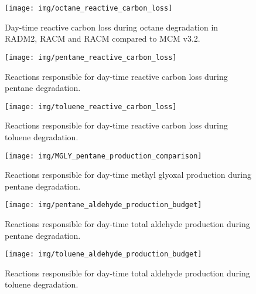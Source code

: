 
\begin{figure}[!htbp]
    \begin{center}
        \texttt{[image: img/octane\_reactive\_carbon\_loss]}
        \caption{Day-time reactive carbon loss during octane degradation in RADM2, RACM and RACM compared to MCM v3.2.}
        \label{f:octane_carbons}
    \end{center}
\end{figure} 

\begin{figure}[!htbp]
    \begin{center}
        \texttt{[image: img/pentane\_reactive\_carbon\_loss]}
        \caption{Reactions responsible for day-time reactive carbon loss during pentane degradation.}
        \label{f:pentane_carbons}
    \end{center}
\end{figure} 

\begin{figure}[!htbp]
    \begin{center}
        \texttt{[image: img/toluene\_reactive\_carbon\_loss]}
        \caption{Reactions responsible for day-time reactive carbon loss during toluene degradation.}
        \label{f:toluene_carbons}
    \end{center}
\end{figure} 

\begin{figure}[!htbp]
    \begin{center}
        \texttt{[image: img/MGLY\_pentane\_production\_comparison]}
        \caption{Reactions responsible for day-time methyl glyoxal production during pentane degradation.}
        \label{f:MGLY_pentane}
    \end{center}
\end{figure} 

\begin{figure}[!htbp]
    \begin{center}
        \texttt{[image: img/pentane\_aldehyde\_production\_budget]}
        \caption{Reactions responsible for day-time total aldehyde production during pentane degradation.}
        \label{f:pentane_aldehydes}
    \end{center}
\end{figure} 

\begin{figure}[!htbp]
    \begin{center}
        \texttt{[image: img/toluene\_aldehyde\_production\_budget]}
        \caption{Reactions responsible for day-time total aldehyde production during toluene degradation.}
        \label{f:toluene_aldehydes}
    \end{center}
\end{figure} 

